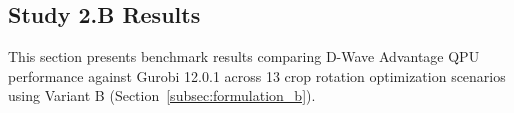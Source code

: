 \documentclass{oqireport}
\begin{document}
\subsection{Study 2.B Results}
\label{subsec:quantum_advantage}

This section presents benchmark results comparing D-Wave Advantage QPU performance against Gurobi 12.0.1 across 13 crop rotation optimization scenarios using Variant B (Section~\ref{subsec:formulation_b}).



\end{document}
